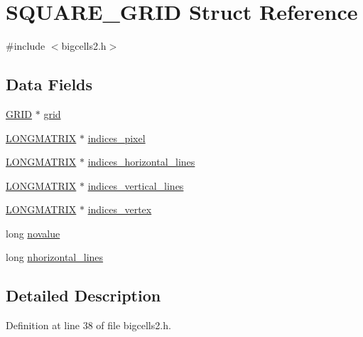 \hypertarget{struct_s_q_u_a_r_e___g_r_i_d}{\section{S\-Q\-U\-A\-R\-E\-\_\-\-G\-R\-I\-D Struct Reference}
\label{struct_s_q_u_a_r_e___g_r_i_d}
}


{\ttfamily \#include $<$bigcells2.\-h$>$}

\subsection*{Data Fields}
\begin{DoxyCompactItemize}
\item 
\hyperlink{struct_g_r_i_d}{G\-R\-I\-D} $\ast$ \hyperlink{struct_s_q_u_a_r_e___g_r_i_d_a1c644dbcb1491fd18a849d116240e8fa}{grid}
\item 
\hyperlink{struct_l_o_n_g_m_a_t_r_i_x}{L\-O\-N\-G\-M\-A\-T\-R\-I\-X} $\ast$ \hyperlink{struct_s_q_u_a_r_e___g_r_i_d_a7fa124cc193522d90d3bff5089f6f582}{indices\-\_\-pixel}
\item 
\hyperlink{struct_l_o_n_g_m_a_t_r_i_x}{L\-O\-N\-G\-M\-A\-T\-R\-I\-X} $\ast$ \hyperlink{struct_s_q_u_a_r_e___g_r_i_d_a51a0e40364a2454fbaf84d5c12314fde}{indices\-\_\-horizontal\-\_\-lines}
\item 
\hyperlink{struct_l_o_n_g_m_a_t_r_i_x}{L\-O\-N\-G\-M\-A\-T\-R\-I\-X} $\ast$ \hyperlink{struct_s_q_u_a_r_e___g_r_i_d_a998e88cee9733cd52f311d413d25bb0c}{indices\-\_\-vertical\-\_\-lines}
\item 
\hyperlink{struct_l_o_n_g_m_a_t_r_i_x}{L\-O\-N\-G\-M\-A\-T\-R\-I\-X} $\ast$ \hyperlink{struct_s_q_u_a_r_e___g_r_i_d_a213bdd312eea160d5f0871f979e486b7}{indices\-\_\-vertex}
\item 
long \hyperlink{struct_s_q_u_a_r_e___g_r_i_d_a45272c3a6d385f45a6f36d6287e20f5d}{novalue}
\item 
long \hyperlink{struct_s_q_u_a_r_e___g_r_i_d_a0e71426cb4e6b8a3570d2a228314ffaa}{nhorizontal\-\_\-lines}
\end{DoxyCompactItemize}


\subsection{Detailed Description}


Definition at line 38 of file bigcells2.\-h.



